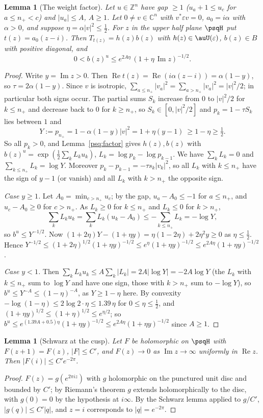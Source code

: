 \documentclass[10pt]{amsart}
\newtheorem{lemma}[theorem]{Lemma}
\theoremstyle{definition}
\theoremstyle{remark}
\newcommand{\C}{\mathbb C}
\newcommand{\Z}{\mathbb Z}
\newcommand{\Rel}{\operatorname{Re}}
\newcommand{\Iml}{\operatorname{Im}}
\begin{document}
\begin{lemma}[The weight factor]\label{psq:bound}
Let $u\in\Z^n$ have gap $\ge1$ \textup($u_a+1\le u_c$ for $a\le n_+<c$\textup) and $|u_a|\le A$,
$A\ge1$. Let $0\ne v\in\C^n$ with $v^*\varepsilon v=0$, $a_0=i\alpha$ with $\alpha>0$, and suppose
$\eta=\alpha|v|^2\le\frac12$. For $z$ in the upper half plane $\psqH$ put $t(z)=a_0(z-i)$. Then
$T_{t(z)}=h(z)b(z)$ with $h(z)\in\auU(\varepsilon)$, $b(z)\in B$ with positive diagonal, and
\[
0<b(z)^u\le e^{2A\eta}\,(1+\eta\,\Iml z)^{-1/2}.
\]
\end{lemma}
\begin{proof}
Write $y=\Iml z>0$. Then $\Rel t(z)=\Rel(i\alpha(z-i))=\alpha(1-y)$, so $\tau=2\alpha(1-y)$. Since $v$ is
isotropic, $\sum_{a\le n_+}|v_a|^2=\sum_{a>n_+}|v_a|^2=|v|^2/2$; in particular both signs occur. The
partial sums $S_k$ increase from $0$ to $|v|^2/2$ for $k\le n_+$ and decrease back to $0$ for
$k\ge n_+$, so $S_k\in[0,|v|^2/2]$ and $p_k=1-\tau S_k$ lies between $1$ and
\[
Y:=p_{n_+}=1-\alpha(1-y)|v|^2=1+\eta(y-1)\ \ge 1-\eta\ge\tfrac12 .
\]
So all $p_k>0$, and Lemma~\ref{psq:factor} gives $h(z),b(z)$ with $b(z)^u=\exp(\frac12\sum_kL_ku_k)$,
$L_k=\log p_k-\log p_{k-1}$. We have $\sum_kL_k=0$ and $\sum_{k\le n_+}L_k=\log Y$. Moreover
$p_k-p_{k-1}=-\tau s_k|v_k|^2$, so all $L_k$ with $k\le n_+$ have the sign of $y-1$ (or vanish) and all
$L_k$ with $k>n_+$ the opposite sign.

\emph{Case $y\ge1$.} Let $A_0=\min_{c>n_+}u_c$; by the gap, $u_a-A_0\le-1$ for $a\le n_+$, and
$u_c-A_0\ge0$ for $c>n_+$. As $L_k\ge0$ for $k\le n_+$ and $L_k\le0$ for $k>n_+$,
\[
\sum_kL_ku_k=\sum_kL_k(u_k-A_0)\le-\sum_{k\le n_+}L_k=-\log Y ,
\]
so $b^u\le Y^{-1/2}$. Now $(1+2\eta)Y-(1+\eta y)=\eta(1-2\eta)+2\eta^2y\ge0$ as $\eta\le\frac12$. Hence $Y^{-1/2}\le
(1+2\eta)^{1/2}(1+\eta y)^{-1/2}\le e^{\eta}(1+\eta y)^{-1/2}\le e^{2A\eta}(1+\eta y)^{-1/2}$.

\emph{Case $y<1$.} Then $\sum_kL_ku_k\le A\sum_k|L_k|=2A|\log Y|=-2A\log Y$ (the $L_k$ with $k\le n_+$
sum to $\log Y$ and have one sign, those with $k>n_+$ sum to $-\log Y$), so $b^u\le Y^{-A}\le
(1-\eta)^{-A}$, as $Y\ge1-\eta$ here. By convexity $-\log(1-\eta)\le2\log2\cdot\eta\le1.39\,\eta$ for
$0\le\eta\le\frac12$, and $(1+\eta y)^{1/2}\le(1+\eta)^{1/2}\le e^{\eta/2}$; so
$b^u\le e^{(1.39A+0.5)\eta}(1+\eta y)^{-1/2}\le e^{2A\eta}(1+\eta y)^{-1/2}$ since $A\ge1$.
\end{proof}

\begin{lemma}[Schwarz at the cusp]\label{psq:schwarz}
Let $F$ be holomorphic on $\psqH$ with $F(z+1)=F(z)$, $|F|\le C'$, and $F(z)\to0$ as $\Iml z\to\infty$
uniformly in $\Rel z$. Then $|F(i)|\le C'e^{-2\pi}$.
\end{lemma}
\begin{proof}
$F(z)=g(e^{2\pi iz})$ with $g$ holomorphic on the punctured unit disc and bounded by $C'$; by Riemann's
theorem $g$ extends holomorphically to the disc, with $g(0)=0$ by the hypothesis at $i\infty$. By the
Schwarz lemma applied to $g/C'$, $|g(q)|\le C'|q|$, and $z=i$ corresponds to $|q|=e^{-2\pi}$.
\end{proof}
\end{document}
